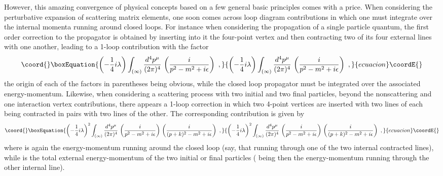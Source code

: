 \documentclass[a4paper,11pt]{article}
\begin{document}
\vspace{5pt}

However, this amazing convergence of physical concepts based on a few
general basic principles comes with a price. When considering the perturbative
expansion of scattering matrix elements, one soon comes across loop diagram
contributions in which one must integrate over the internal momenta running
around closed loops. For instance when considering the propagation of
a single particle quantum, the first order correction to the propagator
is obtained by inserting into it the four-point vertex \coordHE{}
and then contracting two of its four external lines with one another, 
leading to a 1-loop contribution with the factor
\begin{equation}\coord{}\boxEquation{
\left(-\frac{1}{4}i\lambda\right)\int_{(\infty)}\frac{d^4p^\mu}{(2\pi)^4}\,
\left(\frac{i}{p^2-m^2+i\epsilon}\right)\ ,
}{
\left(-\frac{1}{4}i\lambda\right)\int_{(\infty)}\frac{d^4p^\mu}{(2\pi)^4}\,
\left(\frac{i}{p^2-m^2+i\epsilon}\right)\ ,
}{ecuacion}\coordE{}\end{equation}
the origin of each of the factors in parentheses being obvious, while the 
closed loop propagator must be integrated over the associated energy-momentum.
Likewise, when considering a \coordHE{} scattering process with
two initial and two final particles, beyond the nonscattering and
one interaction vertex contributions, there appears a 1-loop correction
in which two 4-point vertices are inserted with two lines of each being
contracted in pairs with two lines of the other. The corresponding 
contribution is given by
\begin{equation}\coord{}\boxEquation{
\left(-\frac{1}{4}i\lambda\right)^2\int_{(\infty)}\frac{d^4p^\mu}{(2\pi)^4}\,
\left(\frac{i}{p^2-m^2+i\epsilon}\right)\,
\left(\frac{i}{(p+k)^2-m^2+i\epsilon}\right)\ ,
}{
\left(-\frac{1}{4}i\lambda\right)^2\int_{(\infty)}\frac{d^4p^\mu}{(2\pi)^4}\,
\left(\frac{i}{p^2-m^2+i\epsilon}\right)\,
\left(\frac{i}{(p+k)^2-m^2+i\epsilon}\right)\ ,
}{ecuacion}\coordE{}\end{equation}
where \coordHE{} is again the energy-momentum running around the closed loop
(say, that running through one of the two internal contracted lines), while 
\coordHE{} is the total external energy-momentum of the two initial or final 
particles (\coordHE{} being then the energy-momentum running through the other 
internal line).
\end{document}
